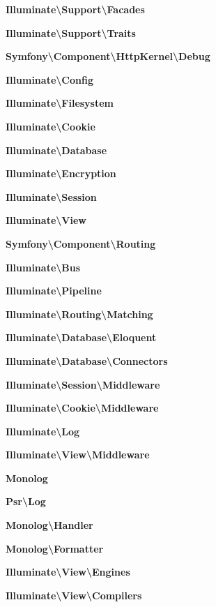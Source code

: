 \begin{DoxyCompactItemize}
 {\bf Illuminate\textbackslash{}\+Support\textbackslash{}\+Facades}
\item 
 {\bf Illuminate\textbackslash{}\+Support\textbackslash{}\+Traits}
\item 
 {\bf Symfony\textbackslash{}\+Component\textbackslash{}\+Http\+Kernel\textbackslash{}\+Debug}
\item 
 {\bf Illuminate\textbackslash{}\+Config}
\item 
 {\bf Illuminate\textbackslash{}\+Filesystem}
\item 
 {\bf Illuminate\textbackslash{}\+Cookie}
\item 
 {\bf Illuminate\textbackslash{}\+Database}
\item 
 {\bf Illuminate\textbackslash{}\+Encryption}
\item 
 {\bf Illuminate\textbackslash{}\+Session}
\item 
 {\bf Illuminate\textbackslash{}\+View}
\item 
 {\bf Symfony\textbackslash{}\+Component\textbackslash{}\+Routing}
\item 
 {\bf Illuminate\textbackslash{}\+Bus}
\item 
 {\bf Illuminate\textbackslash{}\+Pipeline}
\item 
 {\bf Illuminate\textbackslash{}\+Routing\textbackslash{}\+Matching}
\item 
 {\bf Illuminate\textbackslash{}\+Database\textbackslash{}\+Eloquent}
\item 
 {\bf Illuminate\textbackslash{}\+Database\textbackslash{}\+Connectors}
\item 
 {\bf Illuminate\textbackslash{}\+Session\textbackslash{}\+Middleware}
\item 
 {\bf Illuminate\textbackslash{}\+Cookie\textbackslash{}\+Middleware}
\item 
 {\bf Illuminate\textbackslash{}\+Log}
\item 
 {\bf Illuminate\textbackslash{}\+View\textbackslash{}\+Middleware}
\item 
 {\bf Monolog}
\item 
 {\bf Psr\textbackslash{}\+Log}
\item 
 {\bf Monolog\textbackslash{}\+Handler}
\item 
 {\bf Monolog\textbackslash{}\+Formatter}
\item 
 {\bf Illuminate\textbackslash{}\+View\textbackslash{}\+Engines}
\item 
 {\bf Illuminate\textbackslash{}\+View\textbackslash{}\+Compilers}
\item 

\end{DoxyCompactItemize}
